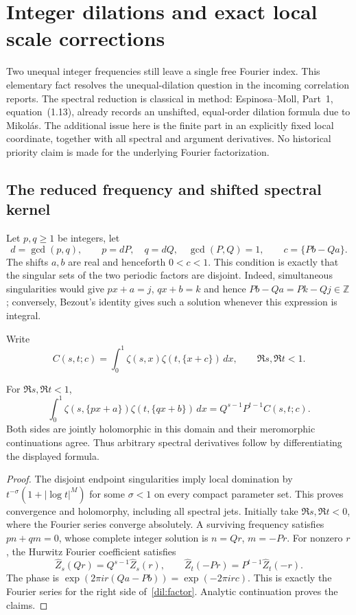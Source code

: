 \section{Integer dilations and exact local scale corrections}
\label{dil:section}

Two unequal integer frequencies still leave a single free Fourier index.
This elementary fact resolves the unequal-dilation question in the incoming
correlation reports. The spectral reduction is classical in method:
Espinosa--Moll, Part~1, equation~(1.13), already records an unshifted,
equal-order dilation formula due to Mikol\'as. The additional issue here is
the finite part in an explicitly fixed local coordinate, together with all
spectral and argument derivatives. No historical priority claim is made for
the underlying Fourier factorization.

\subsection{The reduced frequency and shifted spectral kernel}
Let $p,q\geq1$ be integers, let
\[
 d=\gcd(p,q),\qquad p=dP,\quad q=dQ,\quad \gcd(P,Q)=1,
 \qquad c=\{Pb-Qa\}.
\]
The shifts $a,b$ are real and henceforth $0<c<1$. This condition is exactly
that the singular sets of the two periodic factors are disjoint. Indeed,
simultaneous singularities would give $px+a=j$, $qx+b=k$ and hence
$Pb-Qa=Pk-Qj\in\mathbb Z$; conversely, Bezout's identity gives such a
solution whenever this expression is integral.

Write
\[
 C(s,t;c)=\int_0^1\zeta(s,x)\zeta(t,\{x+c\})\,dx,
 \qquad \Re s,\Re t<1.
\]

\begin{theorem}
\label{dil:master}
For $\Re s,\Re t<1$,
\begin{equation}\label{dil:factor}
 \int_0^1\zeta(s,\{px+a\})\zeta(t,\{qx+b\})\,dx
 =Q^{s-1}P^{t-1}C(s,t;c).
\end{equation}
Both sides are jointly holomorphic in this domain and their meromorphic
continuations agree. Thus arbitrary spectral derivatives follow by
differentiating the displayed formula.
\end{theorem}

\begin{proof}
The disjoint endpoint singularities imply local domination by
$t^{-\sigma}(1+|\log t|^M)$ for some $\sigma<1$ on every compact parameter
set. This proves convergence and holomorphy, including all spectral jets.
Initially take $\Re s,\Re t<0$, where the Fourier series converge
absolutely. A surviving frequency satisfies $pn+qm=0$, whose complete
integer solution is $n=Qr$, $m=-Pr$. For nonzero $r$, the Hurwitz Fourier
coefficient satisfies
\[
 \widehat Z_s(Qr)=Q^{s-1}\widehat Z_s(r),\qquad
 \widehat Z_t(-Pr)=P^{t-1}\widehat Z_t(-r).
\]
The phase is $\exp(2\pi i r(Qa-Pb))=\exp(-2\pi i rc)$. This is exactly
the Fourier series for the right side of~\eqref{dil:factor}. Analytic
continuation proves the claims.
\end{proof}

